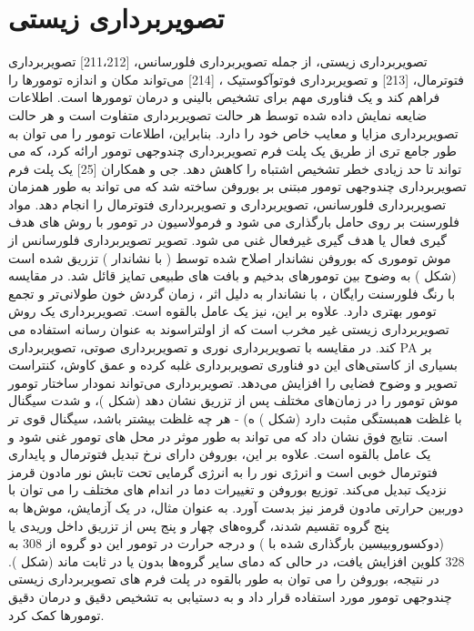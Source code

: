 \section{تصویربرداری زیستی}
تصویربرداری زیستی، از جمله تصویربرداری فلورسانس، [211،212] تصویربرداری فتوترمال، [213] و تصویربرداری فوتوآکوستیک ، [214] می‌تواند مکان و اندازه تومورها را فراهم کند و یک فناوری مهم برای تشخیص بالینی و درمان تومورها است. اطلاعات ضایعه نمایش داده شده توسط هر حالت تصویربرداری متفاوت است و هر حالت تصویربرداری مزایا و معایب خاص خود را دارد. بنابراین، اطلاعات تومور را می توان به طور جامع تری از طریق یک پلت فرم تصویربرداری چندوجهی تومور ارائه کرد، که می تواند تا حد زیادی خطر تشخیص اشتباه را کاهش دهد. جی و همکاران [25] یک پلت فرم تصویربرداری چندوجهی تومور مبتنی بر بوروفن ساخته شد که می تواند به طور همزمان تصویربرداری فلورسانس، تصویربرداری  و تصویربرداری فتوترمال را انجام دهد. مواد فلورسنت بر روی حامل بارگذاری می شود و فرمولاسیون در تومور با روش های هدف گیری فعال یا هدف گیری غیرفعال غنی می شود. تصویر تصویربرداری فلورسانس از موش توموری که بوروفن نشاندار  اصلاح شده توسط  (  با نشاندار ) تزریق شده است (شکل ) به وضوح بین تومورهای بدخیم و بافت های طبیعی تمایز قائل شد. در مقایسه با رنگ فلورسنت رایگان ،  با نشاندار  به دلیل اثر ، زمان گردش خون طولانی‌تر و تجمع تومور بهتری دارد. علاوه بر این،  نیز یک عامل بالقوه  است. تصویربرداری  یک روش تصویربرداری زیستی غیر مخرب است که از اولتراسوند به عنوان رسانه استفاده می کند. در مقایسه با تصویربرداری نوری و تصویربرداری صوتی، تصویربرداری PA بر بسیاری از کاستی‌های این دو فناوری تصویربرداری غلبه کرده و عمق کاوش، کنتراست تصویر و وضوح فضایی را افزایش می‌دهد. تصویربرداری  می‌تواند نمودار ساختار تومور موش تومور را در زمان‌های مختلف پس از تزریق  نشان دهد (شکل )، و شدت سیگنال  با غلظت  همبستگی مثبت دارد (شکل ) ه) - هر چه غلظت  بیشتر باشد، سیگنال قوی تر است. نتایج فوق نشان داد که  می تواند به طور موثر در محل های تومور غنی شود و یک عامل بالقوه  است. علاوه بر این، بوروفن دارای نرخ تبدیل فتوترمال و پایداری فتوترمال خوبی است و انرژی نور را به انرژی گرمایی تحت تابش نور مادون قرمز نزدیک  تبدیل می‌کند. توزیع بوروفن و تغییرات دما در اندام های مختلف را می توان با دوربین حرارتی مادون قرمز نیز بدست آورد. به عنوان مثال، در یک آزمایش، موش‌ها به پنج گروه تقسیم شدند، گروه‌های چهار و پنج پس از تزریق داخل وریدی  یا  (دوکسوروبیسین بارگذاری شده با ) و درجه حرارت در تومور این دو گروه از 308 به 328 کلوین افزایش یافت، در حالی که دمای سایر گروه‌ها بدون  یا  در  ثابت ماند (شکل ). در نتیجه، بوروفن را می توان به طور بالقوه در پلت فرم های تصویربرداری زیستی چندوجهی تومور مورد استفاده قرار داد و به دستیابی به تشخیص دقیق و درمان دقیق تومورها کمک کرد.

